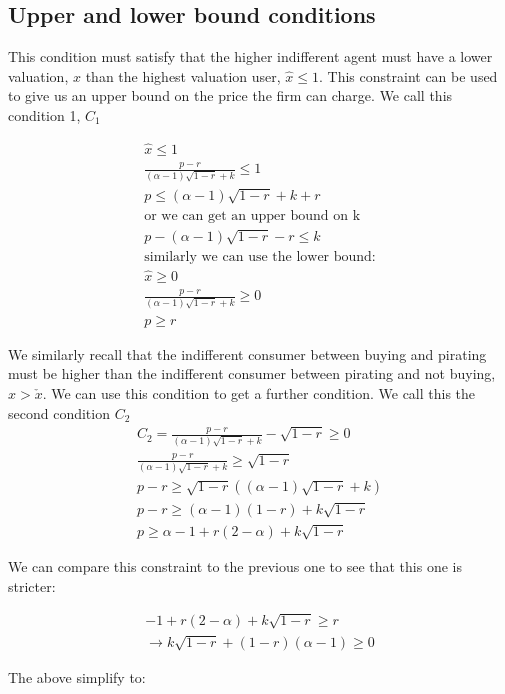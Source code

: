 \documentclass[11pt]{article}
\begin{document}
\subsection{Upper and lower bound conditions}

This condition must satisfy that the higher indifferent agent must have a lower valuation, $x$ than the highest valuation user, $\hat{x} \leq 1$. This constraint can be used to give us an upper bound on the price the firm can charge. We call this condition 1, $C_1$

\begin{align*}
\hat{x} \leq 1 \\
\frac{p-r}{(\alpha-1)\sqrt{ 1 -r }+k} \leq 1
\\
p \leq (\alpha-1)\sqrt{ 1 -r }+k+r \\
\text{or we can get an upper bound on k} \\
p -(\alpha-1)\sqrt{ 1 -r } -r\leq k \\
\text{similarly we can use the lower bound:} \\
\hat{x} \geq 0 \\
\frac{p-r}{(\alpha-1)\sqrt{ 1 -r }+k}  \geq 0 \\
p \geq r
\end{align*}

We similarly recall that the indifferent consumer between buying and pirating must be higher than the indifferent consumer between pirating and not buying, $\hat{x}>\check{x}$. We can use this condition to get a further condition.  We call this the second condition $C_2$
\begin{align*}
C_2 = \frac{p-r}{(\alpha-1)\sqrt{ 1 -r }+k} -\sqrt{ 1 -r } \geq 0
\\
\frac{p-r}{(\alpha-1)\sqrt{ 1 -r }+k} 
\geq
\sqrt{ 1 -r } \\
p-r
\geq \sqrt{ 1 -r }((\alpha-1)\sqrt{ 1 -r }+k) \\
p-r
\geq (\alpha-1)( 1 -r )+k\sqrt{ 1 -r } \\
p
\geq \alpha -1+r(2-\alpha)+k\sqrt{ 1 -r }
\end{align*}

We can compare this constraint to the previous one to see that this one is stricter:

\begin{align*}
-1+r(2-\alpha)+k\sqrt{ 1 -r } \geq r \\
\rightarrow
k\sqrt{ 1 -r } + (1 -r)(\alpha-1) \geq 0
\end{align*}

The above simplify to: 
\end{document}
